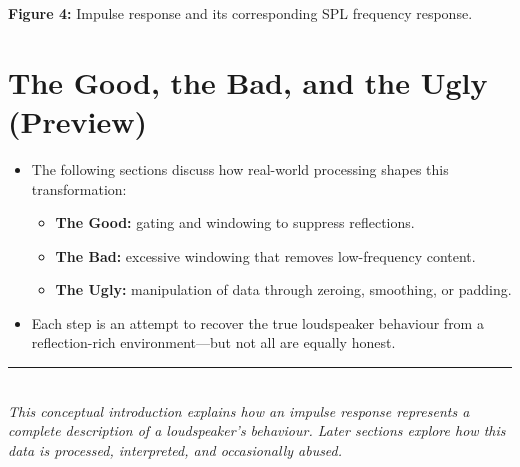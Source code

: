 \documentclass[12pt,a4paper]{article}
\begin{document}
\vspace{1em}
\noindent\textbf{Figure 4:} Impulse response and its corresponding SPL frequency response.

\section{The Good, the Bad, and the Ugly (Preview)}

\begin{itemize}[noitemsep]
    \item The following sections discuss how real-world processing shapes this transformation:
    \begin{itemize}
        \item \textbf{The Good:} gating and windowing to suppress reflections.
        \item \textbf{The Bad:} excessive windowing that removes low-frequency content.
        \item \textbf{The Ugly:} manipulation of data through zeroing, smoothing, or padding.
    \end{itemize}
    \item Each step is an attempt to recover the true loudspeaker behaviour from a reflection-rich environment—but not all are equally honest.
\end{itemize}

\vspace{1em}
\noindent\rule{\textwidth}{0.4pt}\\
\textit{This conceptual introduction explains how an impulse response represents a complete description of a loudspeaker’s behaviour. Later sections explore how this data is processed, interpreted, and occasionally abused.}
\end{document}
